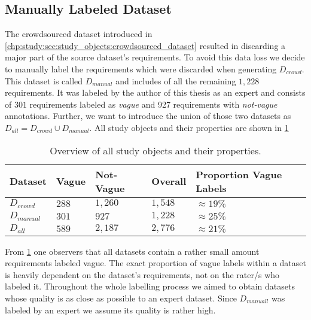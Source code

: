 \subsection{Manually Labeled Dataset}
\label{chp:study:sec:study_objects:dataset_creation:manual_labeling}
The crowdsourced dataset introduced in \cref{chp:study:sec:study_objects:crowdsourced_dataset} resulted in discarding a major part of the source dataset's requirements.
To avoid this data loss we decide to manually label the requirements which were discarded when generating $D_{crowd}$.
This dataset is called $D_{manual}$ and includes of all the remaining $1,228$ requirements.
It was labeled by the author of this thesis as an expert and consists of $301$ requirements labeled as \textit{vague} and 927 requirements with \textit{not-vague} annotations.
Further, we want to introduce the union of those two datasets as $D_{all} = D_{crowd} \cup D_{manual}$.
All study objects and their properties are shown in \cref{tab:study:objects:all_datasets}
\begin{table}[htpb]
    \centering
    \begin{tabular}{l | l l l l}
        \toprule
        Dataset & Vague & Not-Vague & Overall & Proportion Vague Labels \\
        \midrule
        $D_{crowd}$ & $288$ & $1,260$ & $1,548$ & $\approx19\%$\\
        $D_{manual}$ & $301$ & $927$ & $1,228$ & $\approx25\%$\\
        \midrule
        $D_{all}$ & $589$ & $2,187$ & $2,776$ &  $\approx21\%$\\
        \bottomrule
    \end{tabular}
    \caption[Overview of all study objects]{Overview of all study objects and their properties.}\label{tab:study:objects:all_datasets}
\end{table}

From \cref{tab:study:objects:all_datasets} one observers that all datasets contain a rather small amount requirements labeled vague.
The exact proportion of vague labels within a dataset is heavily dependent on the dataset's requirements, not on the rater/s who labeled it.
Throughout the whole labelling process we aimed to obtain datasets whose quality is as close as possible to an expert dataset.
Since $D_{manuall}$ was labeled by an expert we assume its quality is rather high.
